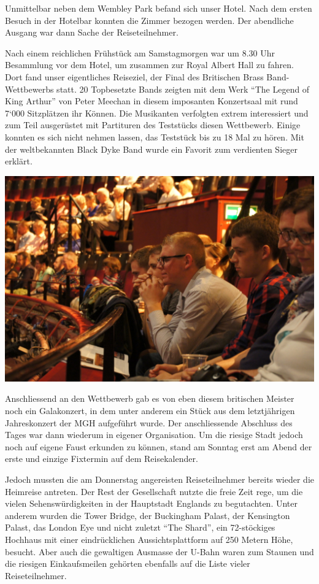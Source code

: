 \begin{history}
    Unmittelbar neben dem Wembley Park befand sich unser Hotel. Nach dem ersten
    Besuch in der Hotelbar konnten die Zimmer bezogen werden. Der abendliche
    Ausgang war dann Sache der Reiseteilnehmer.

    Nach einem reichlichen Frühstück am Samstagmorgen war um 8.30 Uhr Besammlung
    vor dem Hotel, um zusammen zur Royal Albert Hall zu fahren. Dort fand unser
    eigentliches Reiseziel, der Final des Britischen Brass Band-Wettbewerbs
    statt. 20 Topbesetzte Bands zeigten mit dem Werk \enquote{The Legend of King
        Arthur} von Peter Meechan in diesem imposanten Konzertsaal mit rund 7‘000
    Sitzplätzen ihr Können. Die Musikanten verfolgten extrem interessiert und
    zum Teil ausgerüstet mit Partituren des Teststücks diesen Wettbewerb. Einige
    konnten es sich nicht nehmen lassen, das Teststück bis zu 18 Mal zu hören.
    Mit der weltbekannten Black Dyke Band wurde ein Favorit zum verdienten
    Sieger erklärt.

    \begin{MulticolFigure}
        \centering
        \includegraphics[width=0.93\linewidth]{./chap/2001-2024/2014/Britisch-Open-Royal-Alber-Hall.jpg}
    \end{MulticolFigure}

    Anschliessend an den Wettbewerb gab es von eben diesem britischen Meister
    noch ein Galakonzert, in dem unter anderem ein Stück aus dem letztjährigen
    Jahreskonzert der MGH aufgeführt wurde. Der anschliessende Abschluss des
    Tages war dann wiederum in eigener Organisation. Um die riesige Stadt jedoch
    noch auf eigene Faust erkunden zu können, stand am Sonntag erst am Abend der
    erste und einzige Fixtermin auf dem Reisekalender.

    Jedoch mussten die am Donnerstag angereisten Reiseteilnehmer bereits wieder
    die Heimreise antreten. Der Rest der Gesellschaft nutzte die freie Zeit
    rege, um die vielen Sehenswürdigkeiten in der Hauptstadt Englands zu
    begutachten. Unter anderem wurden die Tower Bridge, der Buckingham Palast,
    der Kensington Palast, das London Eye und nicht zuletzt \enquote{The Shard},
    ein 72-stöckiges Hochhaus mit einer eindrücklichen Aussichtsplattform auf
    250 Metern Höhe, besucht. Aber auch die gewaltigen Ausmasse der U-Bahn waren
    zum Staunen und die riesigen Einkaufsmeilen gehörten ebenfalls auf die Liste
    vieler Reiseteilnehmer.


\end{history}
